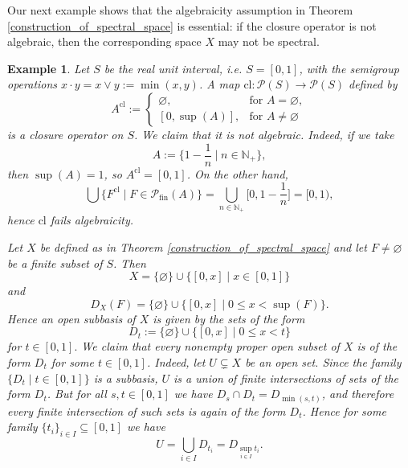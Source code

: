 \documentclass[10pt,a4paper]{amsart}
\newtheorem{example}[theorem]{Example}
\begin{document}
Our next example shows that the algebraicity assumption in Theorem \ref{construction_of_spectral_space} is essential: if the closure operator is not algebraic, then the corresponding space $X$ may not be spectral. 
\begin{example}
    Let $S$ be the real unit interval, i.e. $S = [0,1]$, with the semigroup operations $x\cdot y = x \lor y := \min(x,y)$. A map $\mathrm{cl} : \mathcal{P}(S) \rightarrow \mathcal{P}(S)$ defined by
    \begin{equation*}
    A^{\mathrm{cl}} := 
    \begin{cases}
        \varnothing, & \text{for } A = \varnothing, \\
        [0, \sup(A)], & \text{for } A \neq \varnothing
    \end{cases}
    \end{equation*}
    is a closure operator on $S$. We claim that it is not algebraic. Indeed, if we take \begin{equation*}
        A := \bigg\{1 - \frac{1}{n} \hspace{3pt} \bigg| \hspace{3pt} n \in \mathbb{N}_{+}\bigg\},
    \end{equation*}
    then $\sup(A) = 1$, so $A^{\mathrm{cl}} = [0,1]$. On the other hand, 
    \begin{equation*}
        \bigcup\{F^{\mathrm{cl}} \mid F \in \mathcal{P}_\mathrm{fin}(A)\} = \bigcup_{n \in\mathbb{N}_+} \bigg[0, 1 - \frac{1}{n}\bigg] = [0, 1), 
    \end{equation*}
    hence $\mathrm{cl}$ fails algebraicity. 
    
    Let $X$ be defined as in Theorem \ref{construction_of_spectral_space} and let $F \neq \varnothing$ be a finite subset of $S$. Then \begin{equation*}
        X = \{\varnothing\} \cup \{[0,x] \mid x \in [0,1]\}
    \end{equation*}
    and 
    \begin{equation*}
        D_X(F) = \{\varnothing\} \cup \{[0, x] \mid 0 \leqslant x < \sup(F)\}. 
    \end{equation*}
    Hence an open subbasis of $X$ is given by the sets of the form $$D_t := \{\varnothing\} \cup \{[0,x] \mid 0 \leqslant x < t\}$$ for $t \in [0, 1].$ We claim that every nonempty proper open subset of $X$ is of the form $D_t$ for some $t\in[0,1]$. Indeed, let $U \subsetneq X$ be an open set. Since the family $\{D_t \mid t \in[0,1]\}$ is a subbasis, $U$ is a union of finite intersections of sets of the form $D_t$. But for all $s, t \in [0,1]$ we have $D_s \cap D_t = D_{\min(s, t)}$, and therefore every finite intersection of such sets is again of the form $D_t$. Hence for some family $\{t_i\}_{i \in I} \subseteq [0,1]$ we have $$U = \bigcup_{i\in I} D_{t_i} = D_{\sup_{i \in I}t_i}.$$
    

\end{example}
\end{document}
